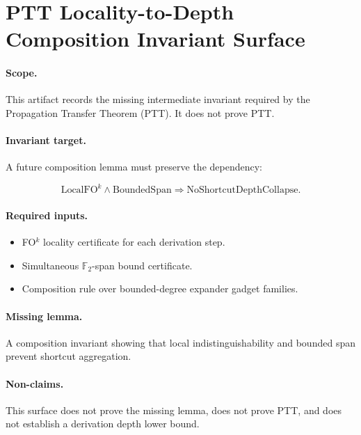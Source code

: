 \section{PTT Locality-to-Depth Composition Invariant Surface}

\paragraph{Scope.}
This artifact records the missing intermediate invariant required by the
Propagation Transfer Theorem (PTT). It does not prove PTT.

\paragraph{Invariant target.}
A future composition lemma must preserve the dependency:

\[
\mathrm{LocalFO}^k
\land
\mathrm{BoundedSpan}
\Longrightarrow
\mathrm{NoShortcutDepthCollapse}.
\]

\paragraph{Required inputs.}
\begin{itemize}
\item FO$^k$ locality certificate for each derivation step.
\item Simultaneous $\mathbb F_2$-span bound certificate.
\item Composition rule over bounded-degree expander gadget families.
\end{itemize}

\paragraph{Missing lemma.}
A composition invariant showing that local indistinguishability and bounded
span prevent shortcut aggregation.

\paragraph{Non-claims.}
This surface does not prove the missing lemma, does not prove PTT, and does not
establish a derivation depth lower bound.
